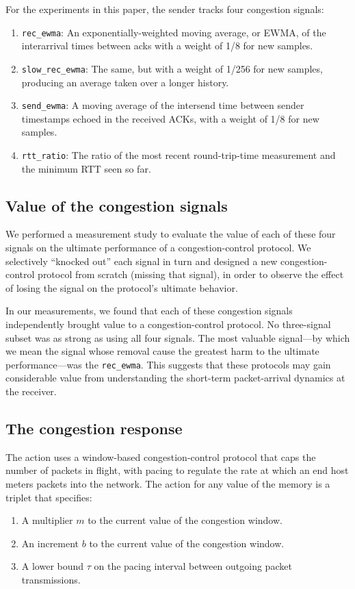 For the experiments in this paper, the sender tracks four
congestion signals:
\begin{enumerate}
\item \texttt{rec\_ewma}: An exponentially-weighted moving average, or
  EWMA, of the interarrival times between acks with a weight of 1/8
  for new samples.
\item \texttt{slow\_rec\_ewma}: The same, but with a weight of 1/256
  for new samples, producing an average taken over a longer history.
\item \texttt{send\_ewma}: A moving average of the intersend time
  between sender timestamps echoed in the received ACKs, with a weight
  of 1/8 for new samples.
\item \texttt{rtt\_ratio}: The ratio of the most recent
  round-trip-time measurement and the minimum RTT seen so far.
\end{enumerate}

\subsection{Value of the congestion signals}

\label{s:signals}

We performed a measurement study to evaluate the value of each of
these four signals on the ultimate performance of a congestion-control
protocol. We selectively ``knocked out'' each signal in turn and
designed a new congestion-control protocol from scratch (missing that
signal), in order to observe the effect of losing the signal on the
protocol's ultimate behavior.

In our measurements, we found that each of these congestion signals
independently brought value to a congestion-control protocol. No
three-signal subset was as strong as using all four signals. The most
valuable signal---by which we mean the signal whose removal cause the
greatest harm to the ultimate performance---was the
\texttt{rec\_ewma}. This suggests that these protocols may gain
considerable value from understanding the short-term packet-arrival
dynamics at the receiver.

\subsection{The congestion response}

The action uses a window-based congestion-control protocol that
caps the number of packets in flight, with pacing to regulate the rate
at which an end host meters packets into the network. The action for
any value of the memory is a triplet that specifies:
\begin{enumerate}
\item A multiplier $m$ to the current value of the congestion window.
\item An increment $b$ to the current value of the congestion window.
\item A lower bound $\tau$ on the pacing interval between outgoing packet transmissions.
\end{enumerate}


